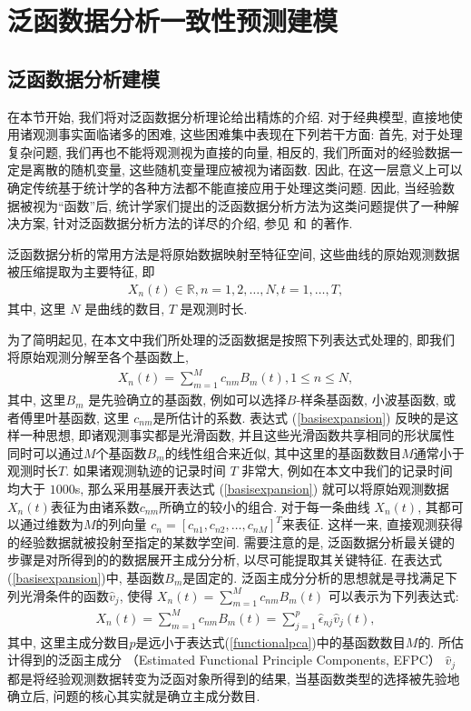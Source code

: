 \section{泛函数据分析一致性预测建模}
\label{sec:fda}
\subsection{泛函数据分析建模}

在本节开始, 我们将对泛函数据分析理论给出精炼的介绍. 对于经典模型, 直接地使用诸观测事实面临诸多的困难, 这些困难集中表现在下列若干方面: 首先, 对于处理复杂问题, 我们再也不能将观测视为直接的向量, 相反的, 我们所面对的经验数据一定是离散的随机变量, 这些随机变量理应被视为诸函数. 因此, 在这一层意义上可以确定传统基于统计学的各种方法都不能直接应用于处理这类问题. 因此, 当经验数据被视为“函数”后, 统计学家们提出的泛函数据分析方法为这类问题提供了一种解决方案, 针对泛函数据分析方法的详尽的介绍, 参见\citep{Ramsay2009} 和 \citep{Kokoszka2017}的著作.

泛函数据分析的常用方法是将原始数据映射至特征空间, 这些曲线的原始观测数据被压缩提取为主要特征, 即
\begin{align}\label{fdaform}
X_{n}(t) \in \mathbb{R}, n=1,2,\ldots,N, t = 1,\ldots,T,
\end{align}
其中, 这里 $N$ 是曲线的数目, $T$ 是观测时长.

为了简明起见, 在本文中我们所处理的泛函数据是按照下列表达式处理的, 即我们将原始观测分解至各个基函数上, 
\begin{align}\label{basisexpansion}
X_{n}(t) = \sum_{m=1}^{M}c_{nm}B_{m}(t), 1 \leq n \leq N,
\end{align}
其中, 这里$B_{m}$ 是先验确立的基函数, 例如可以选择$B$-样条基函数, 小波基函数, 或者傅里叶基函数, 这里 $c_{nm}$是所估计的系数. 表达式 (\ref{basisexpansion}) 反映的是这样一种思想, 即诸观测事实都是光滑函数, 并且这些光滑函数共享相同的形状属性同时可以通过$M$个基函数$B_{m}$的线性组合来近似, 其中这里的基函数数目$M$通常小于观测时长$T$. 如果诸观测轨迹的记录时间 $T$ 非常大, 例如在本文中我们的记录时间均大于 $1000$s, 那么采用基展开表达式 (\ref{basisexpansion}) 就可以将原始观测数据$X_{n}(t)$表征为由诸系数$c_{nm}$所确立的较小的组合. 对于每一条曲线 $X_{n}(t)$, 其都可以通过维数为$M$的列向量 $c_n = [c_{n1},c_{n2},\ldots,c_{nM}]^T$来表征. 这样一来, 直接观测获得的经验数据就被投射至指定的某数学空间. 需要注意的是,  泛函数据分析最关键的步骤是对所得到的的数据展开主成分分析, 以尽可能提取其关键特征. 在表达式(\ref{basisexpansion})中, 基函数$B_m$是固定的. 泛函主成分分析的思想就是寻找满足下列光滑条件的函数$\hat{v}_j$, 使得 $X_{n}(t) = \sum_{m=1}^{M}c_{nm}B_{m}(t)$ 可以表示为下列表达式:
\begin{align}
\label{functionalpca}
X_{n}(t) = \sum_{m=1}^{M}c_{nm}B_{m}(t) =  \sum_{j=1}^{p}\hat{\epsilon}_{nj}\hat{v}_{j}(t),
\end{align}
其中, 这里主成分数目$p$是远小于表达式(\ref{functionalpca})中的基函数数目$M$的. 所估计得到的泛函主成分 （Estimated Functional Principle Components, EFPC） $\hat{v}_j$都是将经验观测数据转变为泛函对象所得到的结果, 当基函数类型的选择被先验地确立后, 问题的核心其实就是确立主成分数目. 

